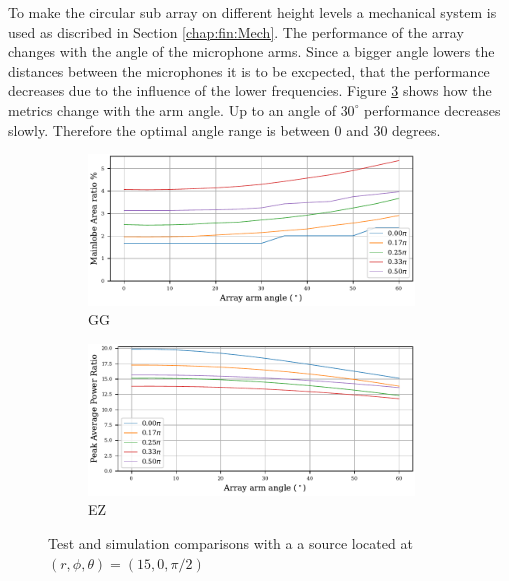 To make the circular sub array on different height levels
a mechanical system is used as discribed in Section \ref{chap:fin:Mech}.
The performance of the array changes with the angle of the microphone arms.
Since a bigger angle lowers the distances between the microphones it is to be 
excpected, that the performance decreases due to the influence of the lower frequencies.
Figure \ref*{fig:fintilt} shows how the metrics change with the arm angle.
Up to an angle of $30^\circ$ performance decreases slowly.
Therefore the optimal angle range is between 0 and 30 degrees.

\begin{figure}[h!]
	\centering
	\begin{subfigure}[b]{1\textwidth}
		\centering
		\includegraphics[width=0.95\textwidth]{images/5_array_evaluation/tilt_area.pdf}
		\caption{GG}
		\label{fig:finartilt}
	\end{subfigure}
	\begin{subfigure}[b]{1\textwidth}
		\centering
		\includegraphics[width=0.95\textwidth]{images/5_array_evaluation/tilt_PAP.pdf}
		\caption{EZ}
		\label{fig:finpaptilt}
	\end{subfigure}
	\caption{Test and simulation comparisons with a a source located at $(r, \phi, \theta) = (15, 0, \pi/2)$}
	\label{fig:fintilt}
\end{figure}


